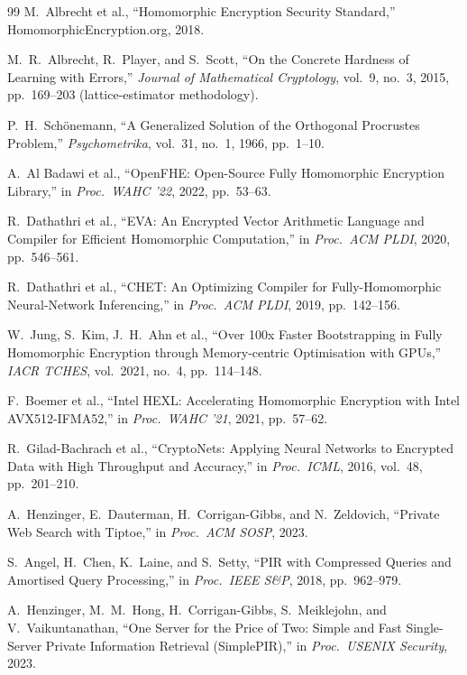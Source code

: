 \documentclass[11pt,a4paper]{article}
\begin{document}
\begin{thebibliography}{99}
 M.\ Albrecht et al., ``Homomorphic Encryption
Security Standard,'' HomomorphicEncryption.org, 2018.

 M.\ R.\ Albrecht, R.\ Player, and S.\ Scott,
``On the Concrete Hardness of Learning with Errors,'' \emph{Journal of
Mathematical Cryptology}, vol.\ 9, no.\ 3, 2015, pp.\ 169--203
(lattice-estimator methodology).

 P.\ H.\ Sch\"onemann, ``A Generalized Solution
of the Orthogonal Procrustes Problem,'' \emph{Psychometrika}, vol.\ 31,
no.\ 1, 1966, pp.\ 1--10.

 A.\ Al Badawi et al., ``OpenFHE: Open-Source Fully
Homomorphic Encryption Library,'' in \emph{Proc.\ WAHC '22},
2022, pp.\ 53--63.

 R.\ Dathathri et al., ``EVA: An Encrypted Vector
Arithmetic Language and Compiler for Efficient Homomorphic
Computation,'' in \emph{Proc.\ ACM PLDI}, 2020, pp.\ 546--561.

 R.\ Dathathri et al., ``CHET: An Optimizing Compiler
for Fully-Homomorphic Neural-Network Inferencing,'' in
\emph{Proc.\ ACM PLDI}, 2019, pp.\ 142--156.

 W.\ Jung, S.\ Kim, J.\ H.\ Ahn et al.,
``Over 100x Faster Bootstrapping in Fully Homomorphic Encryption
through Memory-centric Optimisation with GPUs,'' \emph{IACR TCHES},
vol.\ 2021, no.\ 4, pp.\ 114--148.

 F.\ Boemer et al., ``Intel HEXL: Accelerating
Homomorphic Encryption with Intel AVX512-IFMA52,'' in
\emph{Proc.\ WAHC '21}, 2021, pp.\ 57--62.

 R.\ Gilad-Bachrach et al., ``CryptoNets:
Applying Neural Networks to Encrypted Data with High Throughput and
Accuracy,'' in \emph{Proc.\ ICML}, 2016, vol.\ 48, pp.\ 201--210.

 A.\ Henzinger, E.\ Dauterman, H.\ Corrigan-Gibbs,
and N.\ Zeldovich, ``Private Web Search with Tiptoe,'' in
\emph{Proc.\ ACM SOSP}, 2023.

 S.\ Angel, H.\ Chen, K.\ Laine, and S.\ Setty,
``PIR with Compressed Queries and Amortised Query Processing,'' in
\emph{Proc.\ IEEE S\&P}, 2018, pp.\ 962--979.

 A.\ Henzinger, M.\ M.\ Hong, H.\ Corrigan-Gibbs,
S.\ Meiklejohn, and V.\ Vaikuntanathan, ``One Server for the Price of
Two: Simple and Fast Single-Server Private Information Retrieval
(SimplePIR),'' in \emph{Proc.\ USENIX Security}, 2023.


\end{thebibliography}
\end{document}
